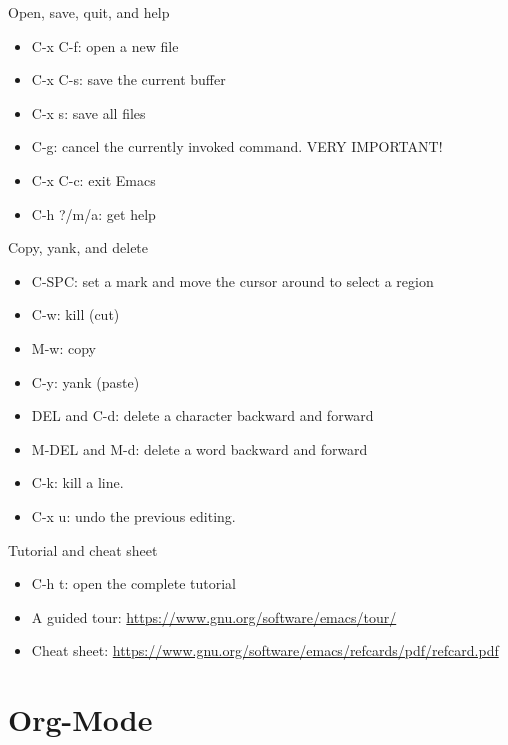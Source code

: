 \documentclass[presentation]{beamer}
\begin{document}
\begin{frame}[label={sec:orgdb0b688}]{Open, save, quit, and help}
\begin{itemize}
\item C-x C-f: open a new file
\item C-x C-s: save the current buffer
\item C-x s: save all files
\item C-g: cancel the currently invoked command. VERY IMPORTANT!
\item C-x C-c: exit Emacs
\item C-h ?/m/a: get help
\end{itemize}
\end{frame}

\begin{frame}[label={sec:orgdb2ccf0}]{Copy, yank, and delete}
\begin{itemize}
\item C-SPC: set a mark and move the cursor around to select a region
\item C-w: kill (cut)
\item M-w: copy
\item C-y: yank (paste)
\item DEL and C-d: delete a character backward and forward
\item M-DEL and M-d: delete a word backward and forward
\item C-k: kill a line.
\item C-x u: undo the previous editing.
\end{itemize}
\end{frame}

\begin{frame}[label={sec:org48f5bf3}]{Tutorial and cheat sheet}
\begin{itemize}
\item C-h t: open the complete tutorial

\item A guided tour: \url{https://www.gnu.org/software/emacs/tour/}

\item Cheat sheet: \url{https://www.gnu.org/software/emacs/refcards/pdf/refcard.pdf}
\end{itemize}
\end{frame}


\section*{Org-Mode}
\label{sec:orgdf3343a}
\end{document}
